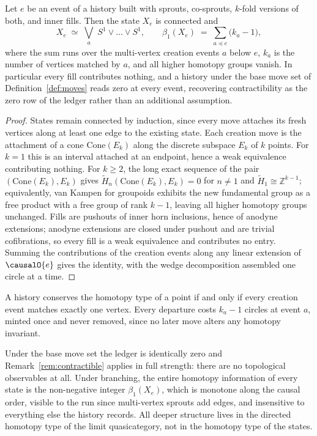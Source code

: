 \begin{proposition}
\label{prop:ledger}
Let $e$ be an event of a history built with sprouts, co-sprouts, $k$-fold versions of both, and inner fills.
Then the state $X_e$ is connected and
\[
X_e \;\simeq\; \bigvee_{a}\; S^1 \vee \dots \vee S^1,
\qquad
\beta_1(X_e) \;=\; \sum_{a \preceq e} \bigl(k_a - 1\bigr),
\]
where the sum runs over the multi-vertex creation events $a$ below $e$, $k_a$ is the number of vertices matched by $a$, and all higher homotopy groups vanish.
In particular every fill contributes nothing, and a history under the base move set of Definition~\ref{def:moves} reads zero at every event, recovering contractibility as the zero row of the ledger rather than an additional assumption.
\end{proposition}

\begin{proof}
States remain connected by induction, since every move attaches its fresh vertices along at least one edge to the existing state.
Each creation move is the attachment of a cone $\mathrm{Cone}(E_k)$ along the discrete subspace $E_k$ of $k$ points.
For $k=1$ this is an interval attached at an endpoint, hence a weak equivalence contributing nothing.
For $k \geq 2$, the long exact sequence of the pair $(\mathrm{Cone}(E_k), E_k)$ gives $\widetilde{H}_n(\mathrm{Cone}(E_k), E_k) = 0$ for $n \neq 1$ and $\widetilde{H}_1 \cong \mathbb{Z}^{k-1}$; equivalently, van Kampen for groupoids exhibits the new fundamental group as a free product with a free group of rank $k-1$, leaving all higher homotopy groups unchanged.
Fills are pushouts of inner horn inclusions, hence of anodyne extensions; anodyne extensions are closed under pushout and are trivial cofibrations, so every fill is a weak equivalence and contributes no entry.
Summing the contributions of the creation events along any linear extension of $\causalO{e}$ gives the identity, with the wedge decomposition assembled one circle at a time.
\end{proof}

\begin{corollary}
\label{cor:ledgerzero}
A history conserves the homotopy type of a point if and only if every creation event matches exactly one vertex.
Every departure costs $k_a - 1$ circles at event $a$, minted once and never removed, since no later move alters any homotopy invariant.
\end{corollary}

\begin{remark}
\label{rem:wedge}
Under the base move set the ledger is identically zero and Remark~\ref{rem:contractible} applies in full strength: there are no topological observables at all.
Under branching, the entire homotopy information of every state is the non-negative integer $\beta_1(X_e)$, which is monotone along the causal order, visible to the run since multi-vertex sprouts add edges, and insensitive to everything else the history records.
All deeper structure lives in the directed homotopy type of the limit quasicategory, not in the homotopy type of the states.
\end{remark}

